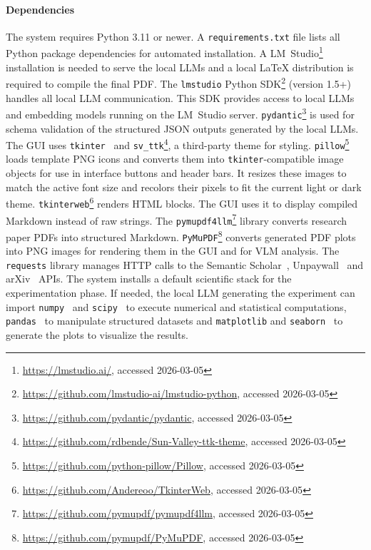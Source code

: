 \paragraph{Dependencies}
The system requires Python 3.11 or newer.
A \texttt{requirements.txt} file lists all Python package dependencies for automated installation.
A LM~Studio\footnote{\url{https://lmstudio.ai/}, accessed 2026-03-05} installation is needed to serve the local LLMs and a local \LaTeX{} distribution is required to compile the final PDF.
The \texttt{lmstudio} Python SDK\footnote{\url{https://github.com/lmstudio-ai/lmstudio-python}, accessed 2026-03-05} (version 1.5+) handles all local LLM communication.
This SDK provides access to local LLMs and embedding models running on the LM~Studio server.
\texttt{pydantic}\footnote{\url{https://github.com/pydantic/pydantic}, accessed 2026-03-05} is used for schema validation of the structured JSON outputs generated by the local LLMs.
The GUI uses \texttt{tkinter}~\cite{Tkinter} and \texttt{sv\_ttk}\footnote{\url{https://github.com/rdbende/Sun-Valley-ttk-theme}, accessed 2026-03-05}, a third-party theme for styling.
\texttt{pillow}\footnote{\url{https://github.com/python-pillow/Pillow}, accessed 2026-03-05} loads template PNG icons and converts them into \texttt{tkinter}-compatible image objects for use in interface buttons and header bars.
It resizes these images to match the active font size and recolors their pixels to fit the current light or dark theme.
\texttt{tkinterweb}\footnote{\url{https://github.com/Andereoo/TkinterWeb}, accessed 2026-03-05} renders HTML blocks.
The GUI uses it to display compiled Markdown instead of raw strings.
The \texttt{pymupdf4llm}\footnote{\url{https://github.com/pymupdf/pymupdf4llm}, accessed 2026-03-05} library converts research paper PDFs into structured Markdown.
\texttt{PyMuPDF}\footnote{\url{https://github.com/pymupdf/PyMuPDF}, accessed 2026-03-05} converts generated PDF plots into PNG images for rendering them in the GUI and for VLM analysis.
The \texttt{requests} library manages HTTP calls to the Semantic Scholar~\cite{kinney2025semanticscholaropendata}, Unpaywall~\cite{Unpaywall} and arXiv~\cite{arXiv} APIs.
The system installs a default scientific stack for the experimentation phase.
If needed, the local LLM generating the experiment can import \texttt{numpy}~\cite{Harris_2020} and \texttt{scipy}~\cite{SciPy} to execute numerical and statistical computations, \texttt{pandas}~\cite{Pandas} to manipulate structured datasets and \texttt{matplotlib} and \texttt{seaborn}~\cite{Bisong2019} to generate the plots to visualize the results.

